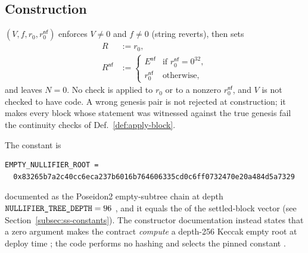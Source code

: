 \subsection{Construction}
\label{subsec:pool-ctor}

\begin{definition}[Constructor]
\label{def:pool-ctor}
$(V, f, r_0, r^{\mathsf{nf}}_0)$ enforces
$V \ne 0$ and $f \ne 0$ (string reverts), then sets
\begin{align}
  R &:= r_0, \\
  R^{\mathsf{nf}} &:= \begin{cases} E^{\mathsf{nf}} & \text{if } r^{\mathsf{nf}}_0 = 0^{32},\\
                                  r^{\mathsf{nf}}_0 & \text{otherwise,}\end{cases}
\end{align}
and leaves $N = 0$.
No check is applied to $r_0$ or to a nonzero $r^{\mathsf{nf}}_0$, and $V$ is not
checked to have code. A wrong genesis pair is not rejected at construction; it
makes every block whose statement was witnessed against the true genesis fail
the continuity checks of Def.~\ref{def:apply-block}.
\end{definition}

\begin{specdelta}
\label{delta:pool-empty-nf}
The constant is
\begin{Verbatim}[fontsize=\small]
EMPTY_NULLIFIER_ROOT =
  0x83265b7a2c40cc6eca237b6016b764606335cd0c6ff0732470e20a484d5a7329
\end{Verbatim}
documented as the Poseidon2 empty-subtree chain at depth
$\texttt{NULLIFIER\_TREE\_DEPTH}=96$
, and it equals the
 of the settled-block vector
(see Section~\ref{subsec:ss-constants}). The constructor documentation instead
states that a zero argument makes the contract \emph{compute} a depth-256
Keccak empty root at deploy time
; the code performs no hashing and
selects the pinned constant 
.
\end{specdelta}

